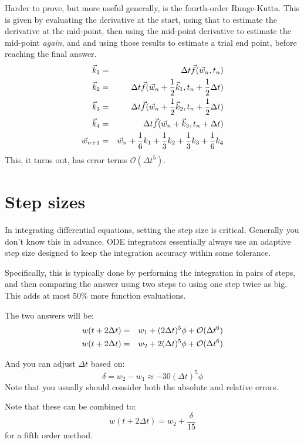Harder to prove, but more useful generally, is the fourth-order
Runge-Kutta. This is given by evaluating the derivative at the start,
using that to estimate the derivative at the mid-point, then using the
mid-point derivative to estimate the mid-point {\it again}, and and
using those results to estimate a trial end point, before reaching the
final answer.
\begin{eqnarray}
\vec{k}_1 &=& \Delta t \vec{f}(\vec{w}_n, t_n) \cr
\vec{k}_2 &=& \Delta t \vec{f}(\vec{w}_n + \frac{1}{2} \vec{k}_1, t_n +
\frac{1}{2} \Delta t) \cr
\vec{k}_3 &=& \Delta t \vec{f}(\vec{w}_n + \frac{1}{2} \vec{k}_2, t_n +
\frac{1}{2} \Delta t) \cr
\vec{k}_4 &=& \Delta t \vec{f}(\vec{w}_n + \vec{k}_3, t_n + \Delta t) \cr
\vec{w}_{n+1}  &=& \vec{w}_n + \frac{1}{6} k_1
+ \frac{1}{3} k_2 + \frac{1}{3} k_3 + \frac{1}{6} k_4
\end{eqnarray}
This, it turns out, has error terms $\mathcal{O}(\Delta t^5)$. 

\section{Step sizes}

In integrating differential equations, setting the step size is
critical. Generally you don't know this in advance. ODE integrators
essentially always use an adaptive step size designed to keep the
integration accuracy within some tolerance.

Specifically, this is typically done by performing the integration in
pairs of steps, and then comparing the answer using two steps to using
one step twice as big. This adds at most 50\% more function
evaluations.

The two answers will be:
\begin{eqnarray}
w(t+ 2\Delta t) &=& w_1 + (2\Delta t)^5 \phi + \mathcal{O}(\Delta t^6)
\cr
w(t+ 2\Delta t) &=& w_2 + 2 (\Delta t)^5 \phi + \mathcal{O}(\Delta t^6)
\end{eqnarray}

And you can adjust $\Delta t$ based on:
\begin{equation}
\delta = w_2 - w_1 \approx - 30 (\Delta t)^5 \phi
\end{equation}
Note that you usually should consider both the absolute and relative
errors. 

Note that these can be combined to:
\begin{equation}
w(t+ 2\Delta t) = w_2 + \frac{\delta}{15}
\end{equation}
for a fifth order method.
